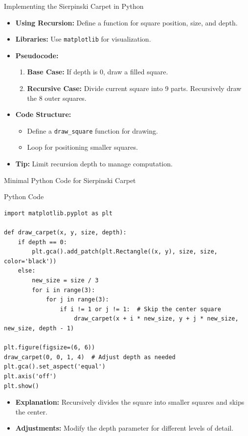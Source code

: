 \documentclass{beamer}
\begin{document}
\begin{frame}{Implementing the Sierpinski Carpet in Python}
    \begin{itemize}
        \item \textbf{Using Recursion:} Define a function for square position, size, and depth.
        \item \textbf{Libraries:} Use \texttt{matplotlib} for visualization.
        \item \textbf{Pseudocode:}
        \begin{enumerate}
            \item \textbf{Base Case:} If depth is 0, draw a filled square.
            \item \textbf{Recursive Case:} Divide current square into 9 parts. Recursively draw the 8 outer squares.
        \end{enumerate}
        \item \textbf{Code Structure:} 
        \begin{itemize}
            \item Define a \texttt{draw\_square} function for drawing.
            \item Loop for positioning smaller squares.
        \end{itemize}
        \item \textbf{Tip:} Limit recursion depth to manage computation.
    \end{itemize}
\end{frame}

\begin{frame}[fragile]{Minimal Python Code for Sierpinski Carpet}
\tiny{
    \begin{block}{Python Code}
    \begin{verbatim}
import matplotlib.pyplot as plt

def draw_carpet(x, y, size, depth):
    if depth == 0:
        plt.gca().add_patch(plt.Rectangle((x, y), size, size, color='black'))
    else:
        new_size = size / 3
        for i in range(3):
            for j in range(3):
                if i != 1 or j != 1:  # Skip the center square
                    draw_carpet(x + i * new_size, y + j * new_size, new_size, depth - 1)

plt.figure(figsize=(6, 6))
draw_carpet(0, 0, 1, 4)  # Adjust depth as needed
plt.gca().set_aspect('equal')
plt.axis('off')
plt.show()
    \end{verbatim}
    \end{block}
    \begin{itemize}
        \item \textbf{Explanation:} Recursively divides the square into smaller squares and skips the center.
        \item \textbf{Adjustments:} Modify the depth parameter for different levels of detail.
    \end{itemize}}
\end{frame}
\end{document}
